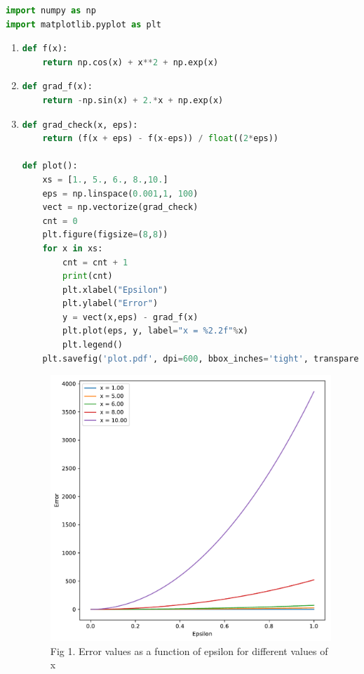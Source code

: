 \documentclass[submit]{harvardml}
\begin{document}
\begin{lstlisting}[language=python]
import numpy as np
import matplotlib.pyplot as plt
\end{lstlisting}
\begin{enumerate}[label=(\alph*)]
	\item \begin{lstlisting}[language=python]
def f(x):
	return np.cos(x) + x**2 + np.exp(x)
		\end{lstlisting}
	
	\item \begin{lstlisting}[language=python]
def grad_f(x):
	return -np.sin(x) + 2.*x + np.exp(x)
		\end{lstlisting}
	
	\item \begin{lstlisting}[language=python]
def grad_check(x, eps):
    return (f(x + eps) - f(x-eps)) / float((2*eps))

def plot():
    xs = [1., 5., 6., 8.,10.]
    eps = np.linspace(0.001,1, 100)
    vect = np.vectorize(grad_check)
    cnt = 0
    plt.figure(figsize=(8,8))
    for x in xs:
        cnt = cnt + 1
        print(cnt)
        plt.xlabel("Epsilon")
        plt.ylabel("Error")
        y = vect(x,eps) - grad_f(x)
        plt.plot(eps, y, label="x = %2.2f"%x)
        plt.legend()
    plt.savefig('plot.pdf', dpi=600, bbox_inches='tight', transparent=False)
		\end{lstlisting}
		
		\begin{figure}[tbh]
			\includegraphics[scale=.9]{plot.pdf}
			\caption{Fig 1. Error values as a function of epsilon for different values of x}
		\end{figure}
\end{enumerate}
\end{document}
